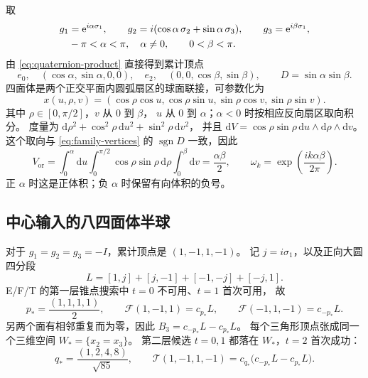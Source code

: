 \documentclass[UTF8,11pt,fontset=none]{ctexart}
\numberwithin{equation}{section}
\theoremstyle{definition}
\DeclareMathOperator{\sgn}{sgn}
\newcommand{\dd}{\mathrm d}
\newcommand{\ee}{\mathrm e}
\newcommand{\Id}{I}
\newcommand{\Vor}{V_{\mathrm{or}}}
\begin{document}
取
\begin{align}
 g_1&=\ee^{i\alpha\sigma_1},\qquad
 g_2=i(\cos\alpha\,\sigma_2+\sin\alpha\,\sigma_3),\qquad
 g_3=\ee^{i\beta\sigma_1},\label{eq:family-input}\\
 &-\pi<\alpha<\pi,\quad\alpha\ne0,\qquad 0<\beta<\pi.\notag
\end{align}
由 \eqref{eq:quaternion-product} 直接得到累计顶点
\begin{equation}
 e_0,\quad
 (\cos\alpha,\sin\alpha,0,0),\quad
 e_2,\quad
 (0,0,\cos\beta,\sin\beta),
 \qquad D=\sin\alpha\sin\beta.
 \label{eq:family-vertices}
\end{equation}
四面体是两个正交平面内圆弧扇区的球面联接，可参数化为
\begin{equation}
 x(u,\rho,v)=
 (\cos\rho\cos u,\cos\rho\sin u,
  \sin\rho\cos v,\sin\rho\sin v).
 \label{eq:join-parameter}
\end{equation}
其中 $\rho\in[0,\pi/2]$，$v$ 从 $0$ 到 $\beta$，
$u$ 从 $0$ 到 $\alpha$；$\alpha<0$ 时按相应反向扇区取向积分。
度量为
$\dd\rho^2+\cos^2\rho\,\dd u^2+\sin^2\rho\,\dd v^2$，
并且
$\dd V=\cos\rho\sin\rho\,\dd u\wedge\dd\rho\wedge\dd v$。
这个取向与 \eqref{eq:family-vertices} 的 $\sgn D$ 一致，因此
\begin{equation}
 \Vor=\int_0^\alpha\dd u\int_0^{\pi/2}
 \cos\rho\sin\rho\,\dd\rho\int_0^\beta\dd v
 =\frac{\alpha\beta}{2},
 \qquad
 \omega_k=\exp\left(\frac{ik\alpha\beta}{2\pi}\right).
 \label{eq:family-volume}
\end{equation}
正 $\alpha$ 时这是正体积；负 $\alpha$ 时保留有向体积的负号。

\subsection{中心输入的八四面体半球}

对于 $g_1=g_2=g_3=-\Id$，累计顶点是 $(1,-1,1,-1)$。
记 $j=i\sigma_1$，以及正向大圆四分段
\begin{equation}
 L=[1,j]+[j,-1]+[-1,-j]+[-j,1].
 \label{eq:center-circle}
\end{equation}
E/F/T 的第一层锥点搜索中 $t=0$ 不可用、$t=1$ 首次可用，
故
\begin{equation}
 p_*=\frac{(1,1,1,1)}2,\qquad
 \mathcal F(1,-1,1)=c_{p_*}L,\qquad
 \mathcal F(-1,1,-1)=c_{-p_*}L.
 \label{eq:center-faces}
\end{equation}
另两个面有相邻重复而为零，因此
$B_3=c_{-p_*}L-c_{p_*}L$。
每个三角形顶点张成同一个三维空间
$W_*=\{x_2=x_3\}$。
第二层候选 $t=0,1$ 都落在 $W_*$，$t=2$ 首次成功：
\begin{equation}
 q_*=\frac{(1,2,4,8)}{\sqrt{85}},\qquad
 \mathcal T(1,-1,1,-1)
 =c_{q_*}\big(c_{-p_*}L-c_{p_*}L\big).
 \label{eq:center-T}
\end{equation}
\end{document}
